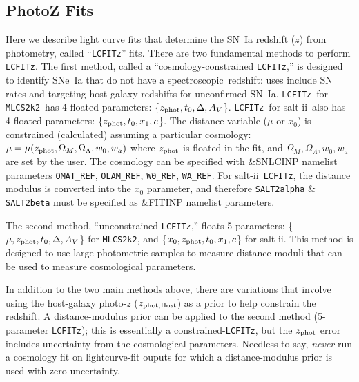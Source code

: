 \documentclass[12pt]{article}
\newcommand{\mlcs}{{\tt MLCS2k2}}
\newcommand{\SALTII}{{\sc salt-ii}}
\newcommand{\Zphot}{z_{\rm phot}}
\newcommand{\spec}{spectroscopic}
\newcommand{\OM}{\Omega_M}
\newcommand{\OL}{\Omega_{\Lambda}}
\begin{document}
   \clearpage
   \subsection{PhotoZ Fits}
   \label{subsec:photoz}

\newcommand{\lcfitz}{{\tt LCFITz}}
\newcommand{\ZphotHost}{z_{\rm phot,Host}}

Here we describe light curve fits that determine the
SN~Ia redshift ($z$) from photometry, called ``\lcfitz'' fits.
There are two fundamental methods to perform \lcfitz.
The first method, called a ``cosmology-constrained \lcfitz,'' 
is designed to identify SNe~Ia that do not have
a \spec\ redshift: uses include SN rates and targeting
host-galaxy redshifts for unconfirmed SN~Ia.
\lcfitz\ for \mlcs\ has 4 floated parameters: 
\{$\Zphot,t_0,\Delta,A_V$\}.
\lcfitz\ for \SALTII\ also has 4 floated parameters:
\{$\Zphot,t_0,x_1,c$\}.
%
The distance variable ($\mu$ or $x_0$) is constrained (calculated)
assuming a particular cosmology: $\mu = \mu(\Zphot,\OM,\OL,w_0,w_a)$
where $\Zphot$ is floated in the fit, and $\OM,\OL,w_0,w_a$ are
set by the user.  The cosmology can be specified
with \&SNLCINP namelist parameters
{\tt OMAT\_REF}, {\tt OLAM\_REF}, {\tt W0\_REF}, {\tt WA\_REF}.
For \SALTII\ \lcfitz, the distance modulus is converted
into the $x_0$ parameter, and therefore 
{\tt SALT2alpha} \& {\tt SALT2beta} must be specified
as \&FITINP namelist parameters.


The second method, ``unconstrained \lcfitz,''
floats 5 parameters:
\{$\mu,\Zphot,t_0,\Delta,A_V$\} for \mlcs, and
\{$x_0,\Zphot,t_0,x_1,c$\} for \SALTII.
This method is designed to use large photometric samples
to measure distance moduli that can be used to measure
cosmological parameters. 


In addition to the two main methods above, there are
variations that involve using the host-galaxy photo-$z$
($\ZphotHost$) as a prior to help constrain the redshift.
A distance-modulus prior can be applied to the second
method (5-parameter \lcfitz); this is essentially a
constrained-\lcfitz, but the $\Zphot$ error includes uncertainty 
from the cosmological parameters.
Needless to say, {\it never} run a cosmology fit on lightcurve-fit ouputs 
for which a distance-modulus prior is used with zero uncertainty.
\end{document}
